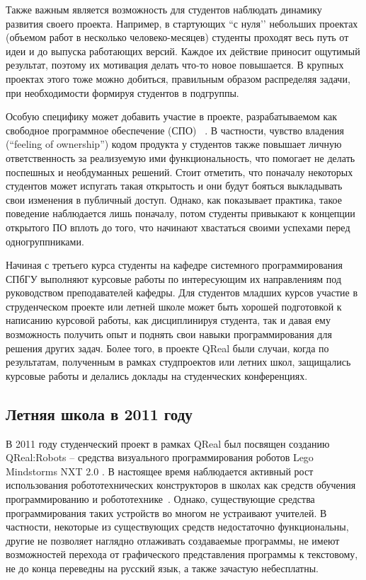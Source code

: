 \documentclass[a4paper]{article}
\begin{document}
Также важным является возможность для студентов наблюдать динамику развития своего проекта. Например, в стартующих ``с нуля’’ небольших проектах (объемом работ в несколько человеко-месяцев) студенты проходят весь путь от идеи и до выпуска работающих версий. Каждое их действие приносит ощутимый результат, поэтому их мотивация делать что-то новое повышается. В крупных проектах этого тоже можно добиться, правильным образом распределяя задачи, при необходимости формируя студентов в подгруппы. 

Особую специфику может добавить участие в проекте, разрабатываемом как свободное программное обеспечение (СПО) ~\cite{saratov}. В частности, чувство владения (``feeling of ownership'') кодом продукта у студентов также повышает личную ответственность за реализуемую ими функциональность, что помогает не делать поспешных и необдуманных решений. Стоит отметить, что поначалу некоторых студентов может испугать такая открытость и они будут бояться выкладывать свои изменения в публичный доступ. Однако, как показывает практика, такое поведение наблюдается лишь поначалу, потом студенты привыкают к концепции открытого ПО вплоть до того, что начинают хвастаться своими успехами перед одногруппниками.

Начиная с третьего курса студенты на кафедре системного программирования СПбГУ выполняют курсовые работы по интересующим их направлениям под руководством преподавателей кафедры. Для студентов младших курсов участие в струденческом проекте или летней школе может быть хорошей подготовкой к написанию курсовой работы, как дисциплинируя студента, так и давая ему возможность получить опыт и поднять свои навыки программирования для решения других задач. Более того, в проекте QReal были случаи, когда по результатам, полученным в рамках студпроектов или летних школ, защищались курсовые работы и делались доклады на студенческих конференциях.
 
\subsection{Летняя школа в 2011 году}

В 2011 году студенческий проект в рамках QReal был посвящен созданию QReal:Robots -- средства визуального программирования роботов Lego Mindstorms NXT 2.0 . В настоящее время наблюдается активный рост использования робототехнических конструкторов в школах как средств обучения программированию и робототехнике~\cite{filippov}. Однако, существующие средства программирования таких устройств во многом не устраивают учителей. В частности, некоторые из существующих средств недостаточно функциональны, другие не позволяет наглядно отлаживать создаваемые программы, не имеют возможностей перехода от графического представления программы к текстовому, не до конца переведны на русский язык, а также зачастую небесплатны.
\end{document}

